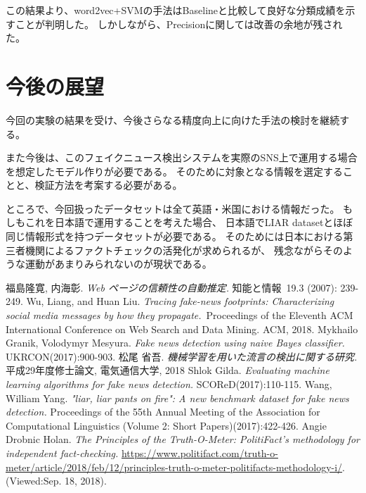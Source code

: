 \documentclass[twocolumn, a4paper, uplatex]{UECIEresume}
\begin{document}
この結果より、word2vec+SVMの手法はBaselineと比較して良好な分類成績を示すことが判明した。
しかしながら、Precisionに関しては改善の余地が残された。

\section{今後の展望}
今回の実験の結果を受け、今後さらなる精度向上に向けた手法の検討を継続する。

また今後は、このフェイクニュース検出システムを実際のSNS上で運用する場合を想定したモデル作りが必要である。
そのために対象となる情報を選定することと、検証方法を考案する必要がある。

ところで、今回扱ったデータセットは全て英語・米国における情報だった。
もしもこれを日本語で運用することを考えた場合、
日本語でLIAR datasetとほぼ同じ情報形式を持つデータセットが必要である。
そのためには日本における第三者機関によるファクトチェックの活発化が求められるが、
残念ながらそのような運動があまりみられないのが現状である。

{\small
\begin{thebibliography}{*}
  福島隆寛, 内海彰. \textit{Web ページの信頼性の自動推定.} 知能と情報 19.3 (2007): 239-249.
  Wu, Liang, and Huan Liu. \textit{Tracing fake-news footprints: Characterizing social media messages by how they propagate.} Proceedings of the Eleventh ACM International Conference on Web Search and Data Mining. ACM, 2018.
  Mykhailo Granik, Volodymyr Mesyura. \textit{Fake news detection using naive Bayes classifier.} UKRCON(2017):900-903.
  松尾 省吾. \textit{機械学習を用いた流言の検出に関する研究.} 平成29年度修士論文, 電気通信大学, 2018
  Shlok Gilda. \textit{Evaluating machine learning algorithms for fake news detection.} SCOReD(2017):110-115.
  Wang, William Yang. \textit{"liar, liar pants on fire": A new benchmark dataset for fake news detection.} Proceedings of the 55th Annual Meeting of the Association for Computational Linguistics (Volume 2: Short Papers)(2017):422-426.
  Angie Drobnic Holan. \textit{The Principles of the Truth-O-Meter: PolitiFact’s methodology for independent fact-checking.} \url{https://www.politifact.com/truth-o-meter/article/2018/feb/12/principles-truth-o-meter-politifacts-methodology-i/}. (Viewed:Sep. 18, 2018).
\end{thebibliography}
}
\end{document}
